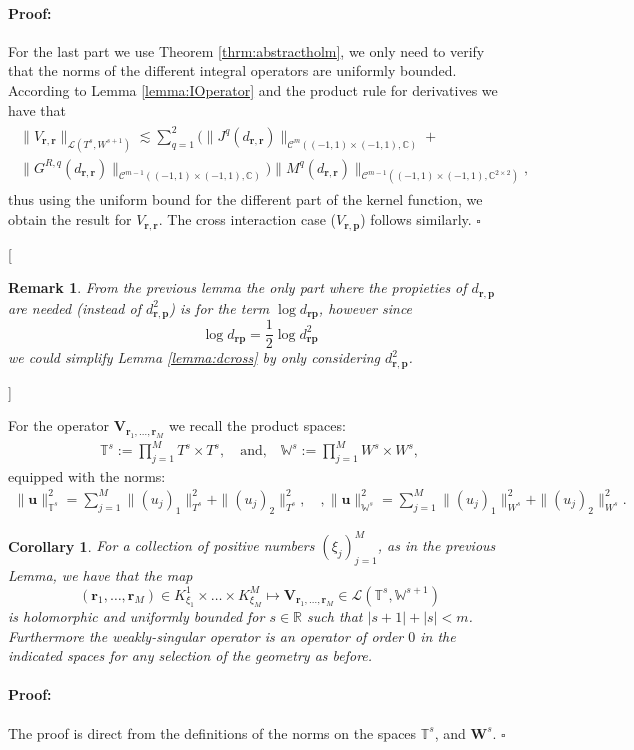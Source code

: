 \documentclass{article}
\newtheorem{corollary}[theorem]{Corollary}
\newtheorem{remark}[theorem]{Remark}
\newenvironment{proof}{\paragraph{Proof:}}{\hfill$\square$}
\newcommand{\todo}[1]{{\color{red}[#1]}}
\newcommand{\IC}{{\mathbb C}}
\newcommand{\IR}{{\mathbb R}}
\newcommand{\bp}{{\bm p}}
\newcommand{\cmspace}[3]{\mathcal{C}^{#1} \left( #2, #3 \right)}
\newcommand{\bu}{\bm{u}}
\newcommand{\br}{\bm{r}}
\newcommand{\iinterv}{(-1,1)\times(-1,1)}
\begin{document}
\begin{proof}
For the last part we use Theorem \ref{thrm:abstractholm}, we only need to verify that the norms of the different integral operators are uniformly bounded. According to Lemma \ref{lemma:IOperator} and the product rule for derivatives we have that 
\begin{align*}
\begin{split}
\| V_{\br, \br}  \|_{\mathcal{L}(T^s,W^{s+1})} \lesssim 
\sum_{q=1}^2 (\| J^q(d_{\br,\br})\|_{\cmspace{m}{\iinterv}{\IC}}+\\
\| G^{R,q}(d_{\br,\br})\|_{\cmspace{m-1}{\iinterv}{\IC}}
)
\| M^q(d_{\br,\br}) \|_{\cmspace{m-1}{\iinterv}{\IC^{2 \times 2}}},
\end{split}
\end{align*}
thus using the uniform bound for the different part of the kernel function, we obtain the result for $V_{\br, \br}$. The cross interaction case ($V_{\br,\bp}$) follows similarly. 
\end{proof} 

\todo{
\begin{remark}
From the previous lemma the only part where the propieties of $d_{\br,\bp}$ are needed (instead of $d^2_{\br,\bp}$) is for the term $\log d_{\br\bp}$, however since 
$$
\log d_{\br\bp} = \frac{1}{2}\log d^2_{\br\bp}
$$
we could simplify Lemma \ref{lemma:dcross} by only considering $d^2_{\br,\bp}$.
\end{remark}
}

For the operator $\mathbf{V}_{\br_1,\hdots,\br_M}$ we recall the product spaces: 
\begin{align*}
\mathbb{T}^s := \prod_{j=1}^M T^s \times T^s, \quad \text{and,}\quad \mathbb{W}^s := \prod_{j=1}^M W^s \times W^s,
\end{align*}
equipped with the norms: 
\begin{align*}
\|\bu\|_{\mathbb{T}^s} ^2 = \sum_{j=1}^M \|(u_j)_1\|^2_{T^s}+
\|(u_j)_2\|^2_{T^s},\quad , \|\bu\|_{\mathbb{W}^s} ^2 = \sum_{j=1}^M \|(u_j)_1\|^2_{W^s}+
\|(u_j)_2\|^2_{W^s}.
\end{align*}
\begin{corollary}
\label{cor:vshapeh}
For a collection of positive numbers $(\xi_j)_{j=1}^M$, as in the previous Lemma, we have that the map
$$(\br_1,\hdots,\br_M) \in K^1_{\xi_1}\times \hdots \times K^M_{\xi_M} \mapsto \mathbf{V}_{\br_1,\hdots,\br_M} \in \mathcal{L}(\mathbb{T}^s, \mathbb{W}^{s+1})$$ is holomorphic and uniformly bounded for $s\in \IR$ such that $|s+1|+|s|< m$. Furthermore the weakly-singular operator is an operator of order $0$ in the indicated spaces for any selection of the geometry as before. 
\end{corollary}
\begin{proof}
The proof is direct from the definitions of the norms on the spaces $\mathbb{T}^s$, and $\mathbf{W}^s$.
\end{proof}
\end{document}
